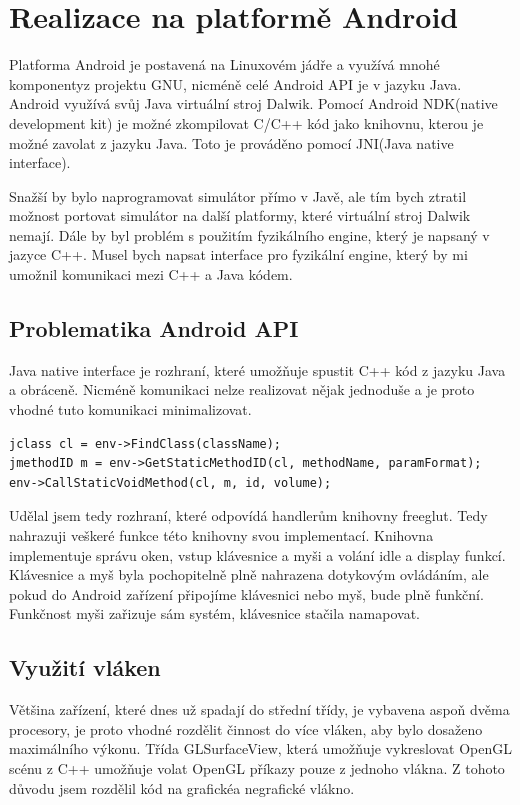 \documentclass[11pt,twoside,a4paper]{book}
\begin{document}
\section{Realizace na platformě Android}
Platforma Android je postavená na Linuxovém jádře a využívá mnohé komponenty\linebreak z projektu GNU, nicméně celé Android API je v jazyku Java. Android využívá svůj Java virtuální stroj Dalwik. Pomocí Android NDK(native development kit) je možné zkompilovat C/C++ kód jako knihovnu, kterou je možné zavolat z jazyku Java. Toto je prováděno pomocí JNI(Java native interface).

Snažší by bylo naprogramovat simulátor přímo v Javě, ale tím bych ztratil možnost portovat simulátor na další platformy, které virtuální stroj Dalwik nemají. Dále by byl problém s použitím fyzikálního engine, který je napsaný v jazyce C++. Musel bych napsat interface pro fyzikální engine, který by mi umožnil komunikaci mezi C++ a Java kódem.

\subsection{Problematika Android API}
Java native interface je rozhraní, které umožňuje spustit C++ kód z jazyku Java a obráceně. Nicméně komunikaci nelze realizovat nějak jednoduše a je proto vhodné tuto komunikaci minimalizovat.
\lstset{language=C++} 
\begin{lstlisting}[caption=Volání Java metody z jazyku C++]
jclass cl = env->FindClass(className);
jmethodID m = env->GetStaticMethodID(cl, methodName, paramFormat);
env->CallStaticVoidMethod(cl, m, id, volume);
\end{lstlisting}

Udělal jsem tedy rozhraní, které odpovídá handlerům knihovny freeglut. Tedy nahrazuji veškeré funkce této knihovny svou implementací. Knihovna implementuje správu oken, vstup klávesnice a myši a volání idle a display funkcí. Klávesnice a myš byla pochopitelně plně nahrazena dotykovým ovládáním, ale pokud do Android zařízení připojíme klávesnici nebo myš, bude plně funkční. Funkčnost myši zařizuje sám systém, klávesnice stačila namapovat.

\subsection{Využití vláken}
Většina zařízení, které dnes už spadají do střední třídy, je vybavena aspoň dvěma procesory, je proto vhodné rozdělit činnost do více vláken, aby bylo dosaženo maximálního výkonu. Třída GLSurfaceView, která umožňuje vykreslovat OpenGL scénu z C++ umožňuje volat OpenGL příkazy pouze z jednoho vlákna. Z tohoto důvodu jsem rozdělil kód na grafické\linebreak a negrafické vlákno.
\end{document}
